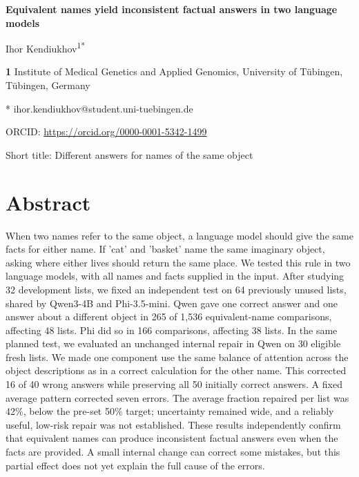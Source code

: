 \documentclass[10pt,letterpaper]{article}
\begin{document}
\vspace*{0.2in}

\begin{flushleft}

{\Large\textbf{Equivalent names yield inconsistent factual answers in two language models}}\par\bigskip

Ihor Kendiukhov\textsuperscript{1*}\par\medskip

\textbf{1} Institute of Medical Genetics and Applied Genomics, University of Tübingen, Tübingen, Germany\par\medskip

* ihor.kendiukhov@student.uni-tuebingen.de\par

ORCID: \url{https://orcid.org/0000-0001-5342-1499}\par

Short title: Different answers for names of the same object

\end{flushleft}

\clearpage


\fancyheadoffset[L]{0in}\fancyfootoffset[L]{0in}

\section*{Abstract}

When two names refer to the same object, a language model should give the same facts for either name. If 'cat' and 'basket' name the same imaginary object, asking where either lives should return the same place. We tested this rule in two language models, with all names and facts supplied in the input. After studying 32 development lists, we fixed an independent test on 64 previously unused lists, shared by Qwen3-4B and Phi-3.5-mini. Qwen gave one correct answer and one answer about a different object in 265 of 1,536 equivalent-name comparisons, affecting 48 lists. Phi did so in 166 comparisons, affecting 38 lists. In the same planned test, we evaluated an unchanged internal repair in Qwen on 30 eligible fresh lists. We made one component use the same balance of attention across the object descriptions as in a correct calculation for the other name. This corrected 16 of 40 wrong answers while preserving all 50 initially correct answers. A fixed average pattern corrected seven errors. The average fraction repaired per list was 42\%, below the pre-set 50\% target; uncertainty remained wide, and a reliably useful, low-risk repair was not established. These results independently confirm that equivalent names can produce inconsistent factual answers even when the facts are provided. A small internal change can correct some mistakes, but this partial effect does not yet explain the full cause of the errors.
\end{document}
